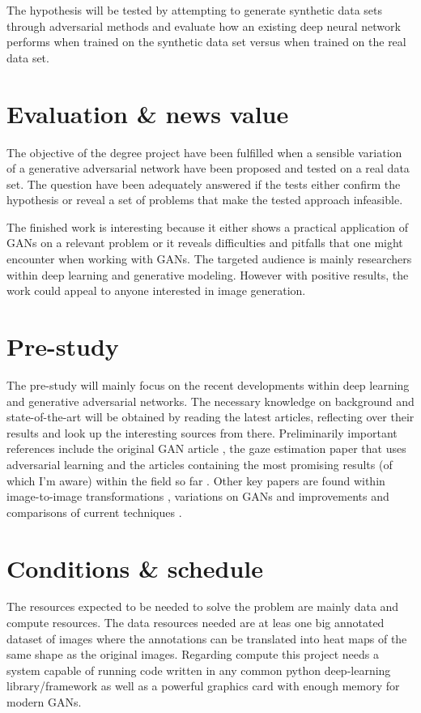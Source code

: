 \documentclass[a4paper]{article}
\begin{document}
The hypothesis will be tested by attempting to generate synthetic data sets through adversarial methods and evaluate how an existing deep neural network performs when trained on the synthetic data set versus when trained on the real data set. 

\section{Evaluation  \& news value}
The objective of the degree project have been fulfilled when a sensible variation of a generative adversarial network have been proposed and tested on a real data set. The question have been adequately answered if the tests either confirm the hypothesis or reveal a set of problems that make the tested approach infeasible. 

The finished work is interesting because it either shows a practical application of GANs on a relevant problem or it reveals difficulties and pitfalls that one might encounter when working with GANs. The targeted audience is mainly researchers within deep learning and generative modeling. However with positive results, the work could appeal to anyone interested in image generation. 

\section{Pre-study}
The pre-study will mainly focus on the recent developments within deep learning and generative adversarial networks. The necessary knowledge on background and state-of-the-art will be obtained by reading the latest articles, reflecting over their results and look up the interesting sources from there. 
Preliminarily important references include the original GAN article \cite{goodfellow2014generative}, the gaze estimation paper that uses adversarial learning \cite{shrivastava2016learning} and the articles containing the most promising results (of which I'm aware) within the field so far \cite{karras2017progressive, miyato2017spectral}. 
Other key papers are found within image-to-image transformations \cite{isola2016image,zhu2017unpaired}, variations on GANs \cite{arjovsky2017wasserstein,berthelot2017began,odena2016conditional} and improvements and comparisons of current techniques \cite{salimans2016improved,gulrajani2017improved,lucic2017gans,xiang2017effects}.

\section{Conditions \& schedule}
The resources expected to be needed to solve the problem are mainly data and compute resources. The data resources needed are at leas one big annotated dataset of images where the annotations can be translated into heat maps of the same shape as the original images. Regarding compute this project needs a system capable of running code written in any common python deep-learning library/framework as well as a powerful graphics card with enough memory for modern GANs. 
\end{document}
